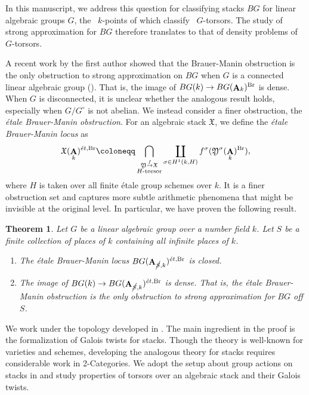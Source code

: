 \documentclass[12pt, final]{amsart}
\theoremstyle{remark}
\theoremstyle{definition}
\theoremstyle{plain}
\newtheorem{theorem}[example]{Theorem}
\newcommand{\fX}{{\mathfrak X}}
\newcommand{\fY}{{\mathfrak Y}}
\newcommand{\et}{{\acute{e}t}}
\DeclareMathOperator{\bA}{{\bf A}}
\newcommand{\cS}{\cancel{S}}
\DeclareMathOperator{\Br}{Br}
\begin{document}
In this manuscript, we address this question for classifying stacks $BG$ for linear algebraic groups $G$, the ~$k$-points of which classify ~$G$-torsors. The study of strong approximation for $BG$ therefore translates to that of density problems of~$G$-torsors. 


A recent work by the first author showed that the Brauer-Manin obstruction is the only obstruction to strong approximation on $BG$ when $G$ is a connected linear algebraic group (\cite[Theorem 5.5]{Dhillon:25}). That is, the image of $BG(k) \to BG(\bA_k)^{\Br}$ is dense. When $G$ is disconnected, it is unclear whether the analogous result holds, especially when $G/G^{\circ}$ is not abelian. We instead consider a finer obstruction, the \emph{\'etale Brauer-Manin obstruction}. For an algebraic stack $\fX$, we define the \emph{\'etale Brauer-Manin locus} as 
\begin{equation*}
    \fX(\bA_k)^{\et, \Br}\coloneqq \bigcap_{\substack{\fY \overset{f}{\to} \fX \\ H \textnormal{-torsor}}} \coprod_{\sigma \in H^1(k,H)} f^{\sigma}(\fY^{\sigma}(\bA_{k})^{\Br}), 
\end{equation*} where $H$ is taken over all finite \'etale group schemes over $k$. It is a finer obstruction set and captures more subtle arithmetic phenomena that might be invisible at the original level.
In particular, we have proven the following result. 


\begin{theorem}\label{thm:intro} 
Let $G$ be a linear algebraic group over a number field $k$. Let $S$ be a finite collection of places of $k$ containing all infinite places of $k$.
    \begin{enumerate}
        \item The \'etale Brauer-Manin locus $BG(\bA_{\cS,k})^{\et,\Br}$ is closed.
        \item The image of $BG(k)\to BG(\bA_{\cS,k})^{\et,\Br}$ is dense. That is, the \'etale Brauer-Manin obstruction is the only obstruction to strong approximation for $BG$ off $S$.
    \end{enumerate}
\end{theorem}

We work under the topology developed in \cite{Dhillon:25}. The main ingredient in the proof is the formalization of Galois twists for stacks. Though the theory is well-known for varieties and schemes, developing the analogous theory for stacks requires considerable work in 2-Categories. We adopt the setup about group actions on stacks in \cite{ginot} and study properties of torsors over an algebraic stack and their Galois twists.
\end{document}
